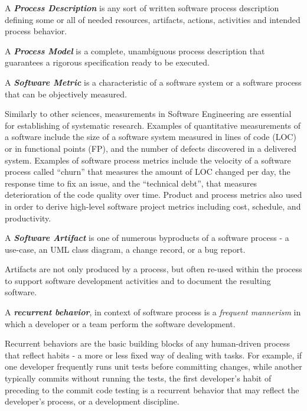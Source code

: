 \begin{defn}\label{def_process_desc}
A \textbf{\textit{Process Description}} is any sort of written software process description defining 
some or all of needed resources, artifacts, actions, activities and intended process behavior.
\end{defn}

\begin{defn}\label{def_process_model}
A \textbf{\textit{Process Model}} is a complete, unambiguous process description that guarantees 
a rigorous specification ready to be executed.
\end{defn}

\begin{defn}\label{def_metric}
A \textbf{\textit{Software Metric}} is a characteristic of a software system or a software process that can be 
objectively measured.
\end{defn}
Similarly to other sciences, measurements in Software Engineering are essential for establishing of systematic 
research. Examples of quantitative measurements of a software include the size of a software system measured 
in lines of code (LOC) or in functional points (FP), and the number of defects discovered in a delivered system. 
Examples of software process metrics include the velocity of a software process called ``churn'' that 
measures the amount of LOC changed per day, the response time to fix an issue, and the ``technical debt'', 
that measures deterioration of the code quality over time. 
Product and process metrics also used in order to derive high-level software project metrics including cost, 
schedule, and productivity.

\begin{defn}\label{def_artifact}
A \textbf{\textit{Software Artifact}} is one of numerous byproducts of a software process - a use-case, 
an UML class diagram, a change record, or a bug report. 
\end{defn}
Artifacts are not only produced by a process, but often re-used within the process to support 
software development activities and to document the resulting software.

\begin{defn}\label{def_behavior}
A \textbf{\textit{recurrent behavior}}, in context of software process is a \textit{frequent mannerism} 
in which a developer or a team perform the software development. 
\end{defn}
Recurrent behaviors are the basic building blocks of any human-driven process that reflect habits - 
a more or less fixed way of dealing with tasks.
For example, if one developer frequently runs unit tests before committing changes, while another typically 
commits without running the tests, the first developer's habit of preceding to the commit code testing 
is a recurrent behavior that may reflect the developer's process, or a development discipline.


